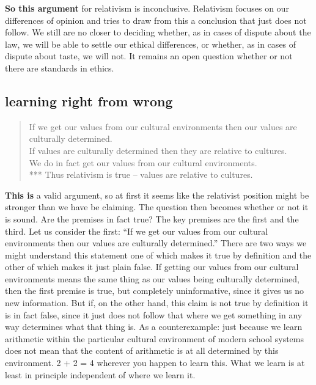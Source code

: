 \documentclass[]{book}
\begin{document}
\textbf{So this argument} for relativism is inconclusive. Relativism focuses on our differences of opinion and tries to draw from this a conclusion that just does not follow. We still are no closer to deciding whether, as in cases of dispute about the law, we will be able to settle our ethical differences, or whether, as in cases of dispute about taste, we will not. It remains an open question whether or not there are standards in ethics.

\hypertarget{learning-right-from-wrong}{%
\subsection*{learning right from wrong}\label{learning-right-from-wrong}}


\begin{quote}
If we get our values from our cultural environments then our values are culturally determined.\\
If values are culturally determined then they are relative to cultures.\\
We do in fact get our values from our cultural environments.\\
*** Thus relativism is true -- values are relative to cultures.
\end{quote}

\textbf{This is} a valid argument, so at first it seems like the relativist position might be stronger than we have be claiming. The question then becomes whether or not it is sound. Are the premises in fact true? The key premises are the first and the third. Let us consider the first: ``If we get our values from our cultural environments then our values are culturally determined.'' There are two ways we might understand this statement one of which makes it true by definition and the other of which makes it just plain false. If getting our values from our cultural environments means the same thing as our values being culturally determined, then the first premise is true, but completely uninformative, since it gives us no new information. But if, on the other hand, this claim is not true by definition it is in fact false, since it just does not follow that where we get something in any way determines what that thing is. As a counterexample: just because we learn arithmetic within the particular cultural environment of modern school systems does not mean that the content of arithmetic is at all determined by this environment. 2 + 2 = 4 wherever you happen to learn this. What we learn is at least in principle independent of where we learn it.
\end{document}
